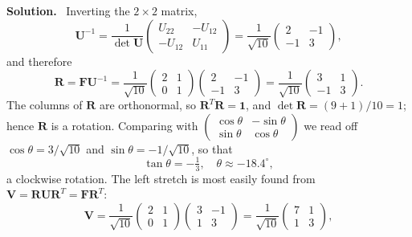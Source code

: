 \documentclass[a4paper,12pt]{paper}
\newenvironment{solution}{\par\noindent\textbf{Solution.}\ }{\par\medskip}
\begin{document}
\begin{solution}
Inverting the $2\times2$ matrix,
\begin{equation}
\mathbf{U}^{-1}=\frac{1}{\det\mathbf{U}}\begin{pmatrix}U_{22}&-U_{12}\\-U_{12}&U_{11}\end{pmatrix}
=\frac{1}{\sqrt{10}}\begin{pmatrix}2&-1\\-1&3\end{pmatrix},
\label{eq:20}
\end{equation}
and therefore
\begin{equation}
\mathbf{R}=\mathbf{F}\mathbf{U}^{-1}=\frac{1}{\sqrt{10}}\begin{pmatrix}2&1\\0&1\end{pmatrix}
\begin{pmatrix}2&-1\\-1&3\end{pmatrix}=\frac{1}{\sqrt{10}}\begin{pmatrix}3&1\\-1&3\end{pmatrix}.
\label{eq:21}
\end{equation}
The columns of $\mathbf{R}$ are orthonormal, so $\mathbf{R}^{T}\mathbf{R}=\mathbf{1}$, and
$\det\mathbf{R}=(9+1)/10=1$; hence $\mathbf{R}$ is a rotation. Comparing with
$\begin{pmatrix}\cos\theta&-\sin\theta\\\sin\theta&\cos\theta\end{pmatrix}$ we read off
$\cos\theta=3/\sqrt{10}$ and $\sin\theta=-1/\sqrt{10}$, so that
\begin{equation}
\tan\theta=-\tfrac{1}{3},\quad\theta\approx-18.4^{\circ},
\label{eq:22}
\end{equation}
a clockwise rotation. The left stretch is most easily found from
$\mathbf{V}=\mathbf{R}\mathbf{U}\mathbf{R}^{T}=\mathbf{F}\mathbf{R}^{T}$:
\begin{equation}
\mathbf{V}=\frac{1}{\sqrt{10}}\begin{pmatrix}2&1\\0&1\end{pmatrix}\begin{pmatrix}3&-1\\1&3\end{pmatrix}
=\frac{1}{\sqrt{10}}\begin{pmatrix}7&1\\1&3\end{pmatrix},
\label{eq:23}

\end{equation}
\end{solution}
\end{document}
